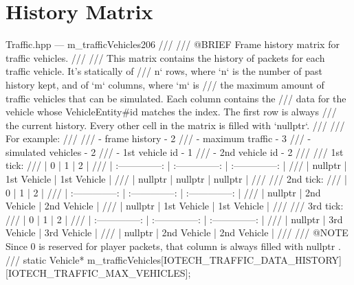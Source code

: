 \section{History Matrix}\label{ax:code:historymatrix}

\begin{codelist}{Traffic.hpp --- m\_trafficVehicles}{206}
///
/// @BRIEF  Frame history matrix for traffic vehicles.
///
/// This matrix contains the history of packets for each traffic vehicle. It's statically of
///  n` rows, where `n` is the number of past history kept, and of `m` columns, where `m` is
/// the maximum amount of traffic vehicles that can be simulated. Each column contains the
/// data for the vehicle whose VehicleEntity#id matches the index. The first row is always
/// the current history. Every other cell in the matrix is filled with `nullptr`.
///
/// For example:
///
/// - frame history - 2
/// - maximum traffic - 3
/// - simulated vehicles - 2
///   - 1st vehicle id - 1
///   - 2nd vehicle id - 2
///
/// 1st tick:
/// | 0                | 1                | 2                |
/// | :--------------: | :--------------: | :--------------: |
/// | nullptr          | 1st Vehicle      | 1st Vehicle      |
/// | nullptr          | nullptr          | nullptr          |
///
/// 2nd tick:
/// | 0                | 1                | 2                |
/// | :--------------: | :--------------: | :--------------: |
/// | nullptr          | 2nd Vehicle      | 2nd Vehicle      |
/// | nullptr          | 1st Vehicle      | 1st Vehicle      |
///
/// 3rd tick:
/// | 0                | 1                | 2                |
/// | :--------------: | :--------------: | :--------------: |
/// | nullptr          | 3rd Vehicle      | 3rd Vehicle      |
/// | nullptr          | 2nd Vehicle      | 2nd Vehicle      |
///
/// @NOTE  Since  0  is reserved for player packets, that column is always filled with  nullptr .
///
static Vehicle* m_trafficVehicles[IOTECH_TRAFFIC_DATA_HISTORY][IOTECH_TRAFFIC_MAX_VEHICLES];
\end{codelist}
